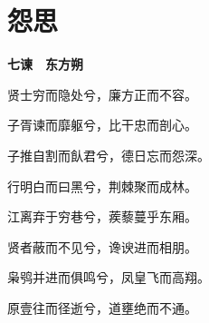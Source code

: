 \documentclass[12pt,a4paper]{ctexbook}
\begin{document}
\section{怨思}
\textbf{七谏　东方朔}\par\vspace{0.5em}
贤士穷而隐处兮，廉方正而不容。\par
子胥谏而靡躯兮，比干忠而剖心。\par
子推自割而飤君兮，德日忘而怨深。\par
行明白而曰黑兮，荆棘聚而成林。\par
江离弃于穷巷兮，蒺藜蔓乎东厢。\par
贤者蔽而不见兮，谗谀进而相朋。\par
枭鸮并进而俱鸣兮，凤皇飞而高翔。\par
原壹往而径逝兮，道壅绝而不通。\par
\end{document}

